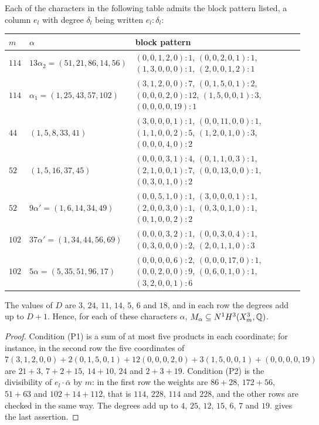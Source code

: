\begin{corollary}\label{cor:patterns}
Each of the characters in the following table admits the block pattern
listed, a column $e_{l}$ with degree $\delta_{l}$ being written $e_{l}{:}
\delta_{l}$:
\begin{center}
\small
\setlength{\tabcolsep}{4pt}
\begin{tabular}{@{}ll>{\raggedright\arraybackslash}p{}@{}}
\toprule
$m$ & $\alpha$ & block pattern\\
\midrule
$114$ & $13\alpha_{2}=(51,21,86,14,56)$ & $(0,0,1,2,0){:}1$, $(0,0,2,0,1){:}1$,
$(1,3,0,0,0){:}1$, $(2,0,0,1,2){:}1$\\
$114$ & $\alpha_{1}=(1,25,43,57,102)$ & $(3,1,2,0,0){:}7$, $(0,1,5,0,1){:}2$,
$(0,0,0,2,0){:}12$, $(1,5,0,0,1){:}3$, $(0,0,0,0,19){:}1$\\
$44$ & $(1,5,8,33,41)$ & $(3,0,0,0,1){:}1$, $(0,0,11,0,0){:}1$,
$(1,1,0,0,2){:}5$, $(1,2,0,1,0){:}3$, $(0,0,0,4,0){:}2$\\
$52$ & $(1,5,16,37,45)$ & $(0,0,0,3,1){:}4$, $(0,1,1,0,3){:}1$,
$(2,1,0,0,1){:}7$, $(0,0,13,0,0){:}1$, $(0,3,0,1,0){:}2$\\
$52$ & $9\alpha'=(1,6,14,34,49)$ & $(0,0,5,1,0){:}1$, $(3,0,0,0,1){:}1$,
$(2,0,0,3,0){:}1$, $(0,3,0,1,0){:}1$, $(0,1,0,0,2){:}2$\\
$102$ & $37\alpha'=(1,34,44,56,69)$ & $(0,0,0,3,2){:}1$, $(0,0,3,0,4){:}1$,
$(0,3,0,0,0){:}2$, $(2,0,1,1,0){:}3$\\
$102$ & $5\alpha=(5,35,51,96,17)$ & $(0,0,0,0,6){:}2$, $(0,0,0,17,0){:}1$,
$(0,0,2,0,0){:}9$, $(0,6,0,1,0){:}1$, $(3,2,0,0,1){:}6$\\
\bottomrule
\end{tabular}
\end{center}
The values of $D$ are $3$, $24$, $11$, $14$, $5$, $6$ and $18$, and in each
row the degrees add up to $D+1$. Hence, for each of these characters
$\alpha$, $M_{\alpha}\subseteq N^{1}H^{3}(X^{3}_{m},\mathbb{Q})$.
\end{corollary}

\begin{proof}
Condition (P1) is a sum of at most five products in each coordinate; for
instance, in the second row the five coordinates of $7(3,1,2,0,0)+2(0,1,5,0,1)
+12(0,0,0,2,0)+3(1,5,0,0,1)+(0,0,0,0,19)$ are $21+3$, $7+2+15$, $14+10$, $24$
and $2+3+19$. Condition (P2) is the divisibility of $e_{l}\cdot\bar\alpha$ by
$m$: in the first row the weights are $86+28$, $172+56$, $51+63$ and
$102+14+112$, that is $114$, $228$, $114$ and $228$, and the other rows are
checked in the same way. The degrees add up to $4$, $25$, $12$, $15$, $6$,
$7$ and $19$.  gives the last assertion.
\end{proof}

